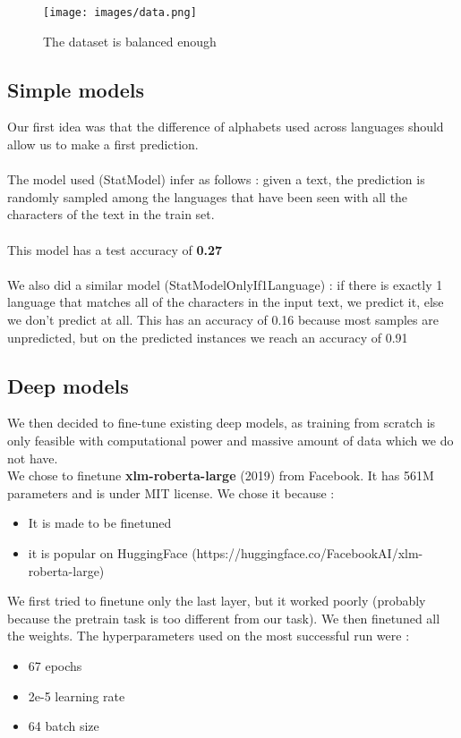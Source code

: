 \documentclass[11pt]{article}
\begin{document}
\begin{figure}[h]
    \centering
    \texttt{[image: images/data.png]}  %
    \caption{The dataset is balanced enough}
    \label{fig:data}
\end{figure}

\subsection{Simple models}
Our first idea was that the difference of alphabets used across languages should allow us to make a first prediction.
\\
\\
The model used (StatModel) infer as follows :
given a text, the prediction is randomly sampled among the languages that have been seen with all the characters of the text in the train set.
\\\\
This model has a test accuracy of \textbf{0.27}
\\\\
We also did a similar model (StatModelOnlyIf1Language) : if there is exactly 1 language that matches all of the characters in the input text, we predict it, else we don't predict at all. This has an accuracy of 0.16 because most samples are unpredicted, but on the predicted instances we reach an accuracy of 0.91

\subsection{Deep models}
We then decided to fine-tune existing deep models, as training from scratch is only feasible with computational power and massive amount of data which we do not have.
\\
We chose to finetune \textbf{xlm-roberta-large} (2019) from Facebook. It has 561M parameters and is under MIT license. We chose it because :
\begin{itemize}[noitemsep, topsep=0pt]
    \item It is made to be finetuned
    \item it is popular on HuggingFace (https://huggingface.co/FacebookAI/xlm-roberta-large)
\end{itemize}

We first tried to finetune only the last layer, but it worked poorly (probably because the pretrain task is too different from our task).
We then finetuned all the weights. The hyperparameters used on the most successful run were :
\begin{itemize}
    \item 67 epochs
    \item 2e-5 learning rate
    \item 64 batch size
\end{itemize}
\end{document}
